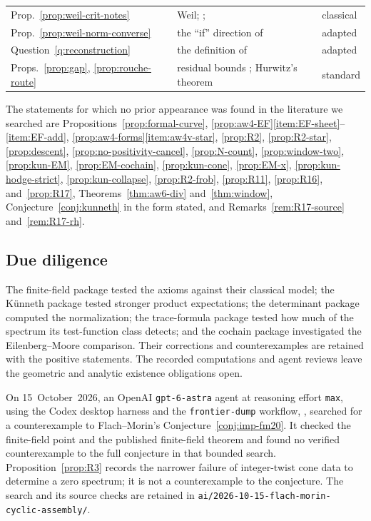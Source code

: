 \documentclass[11pt]{amsart}
\theoremstyle{plain}
\theoremstyle{definition}
\theoremstyle{remark}
\numberwithin{equation}{section}
\begin{document}
{\begin{longtable}{@{}>{\raggedright\arraybackslash}p{}
>{\raggedright\arraybackslash}p{}
>{\raggedright\arraybackslash}p{}@{}}
Prop.~\ref{prop:weil-crit-notes} & Weil;
\cite[Theorem~1]{Bombieri2000Lincei};
\cite[Proposition~C.1]{ConnesConsani2020WeilPositivity} & classical\\
Prop.~\ref{prop:weil-norm-converse} & the ``if'' direction of
\cite[Theorems~1.4 and~4.4]{Suzuki2023WeilHilbert} & adapted\\
Question~\ref{q:reconstruction} & the definition of
\cite[p.~27]{Suzuki2026WeilScrew} & adapted\\
Props.~\ref{prop:gap}, \ref{prop:rouche-route} & residual bounds
\cite[Theorem~3.9]{Saad2011Eigenvalue}; Hurwitz's theorem & standard\\
\end{longtable}
}

The statements for which no prior appearance was found in the
literature we searched are Propositions~\ref{prop:formal-curve},
\ref{prop:aw4-EF}\ref{item:EF-sheet}--\ref{item:EF-add},
\ref{prop:aw4-forms}\ref{item:aw4v-star}, \ref{prop:R2},
\ref{prop:R2-star}, \ref{prop:descent},
\ref{prop:no-positivity-cancel}, \ref{prop:N-count},
\ref{prop:window-two}, \ref{prop:kun-EM}, \ref{prop:EM-cochain},
\ref{prop:kun-cone}, \ref{prop:EM-x}, \ref{prop:kun-hodge-strict},
\ref{prop:kun-collapse}, \ref{prop:R2-frob}, \ref{prop:R11},
\ref{prop:R16}, and~\ref{prop:R17}, Theorems~\ref{thm:aw6-div}
and~\ref{thm:window}, Conjecture~\ref{conj:kunneth} in the form
stated, and Remarks~\ref{rem:R17-source} and~\ref{rem:R17-rh}.

\subsection{Due diligence}
The finite-field package tested the axioms against their classical
model; the K\"unneth package tested stronger product expectations; the
determinant package computed the normalization; the trace-formula
package tested how much of the spectrum its test-function class detects;
and the cochain package investigated the Eilenberg--Moore comparison.
Their corrections and counterexamples are retained with the positive
statements. The recorded computations and agent reviews leave the
geometric and analytic existence obligations open.

On 15~October~2026, an OpenAI \nolinkurl{gpt-6-astra} agent at reasoning
effort \nolinkurl{max}, using the Codex desktop harness and the
\nolinkurl{frontier-dump} workflow,
\cite[\href{https://openai.com/codex/}{product description}]%
{OpenAICodex,OpenAIGPT6Astra}, searched for a counterexample to
Flach--Morin's Conjecture~\ref{conj:imp-fm20}. It checked the
finite-field point and the published finite-field theorem and found
no verified counterexample to the full conjecture in that bounded
search. Proposition~\ref{prop:R3} records the narrower failure of
integer-twist cone data to determine a zero spectrum; it is not a
counterexample to the conjecture. The search and its source checks
are retained in
\nolinkurl{ai/2026-10-15-flach-morin-cyclic-assembly/}.
\end{document}
